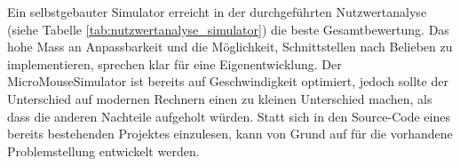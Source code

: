 \documentclass[../main.tex]{subfiles}
\begin{document}
\begin{table}[H]
    \caption{Nutzwertanalyse Simulator}
    \label{tab:nutzwertanalyse_simulator}
\end{table}

Ein selbstgebauter Simulator erreicht in der durchgeführten Nutzwertanalyse (siehe Tabelle \ref{tab:nutzwertanalyse_simulator}) die beste Gesamtbewertung. Das hohe Mass an Anpassbarkeit und die Möglichkeit, Schnittstellen nach Belieben zu implementieren, sprechen klar für eine Eigenentwicklung. Der MicroMouseSimulator ist bereits auf Geschwindigkeit optimiert, jedoch sollte der Unterschied auf modernen Rechnern einen zu kleinen Unterschied machen, als dass die anderen Nachteile aufgeholt würden. Statt sich in den Source-Code eines bereits bestehenden Projektes einzulesen, kann von Grund auf für die vorhandene Problemstellung entwickelt werden.
\end{document}

